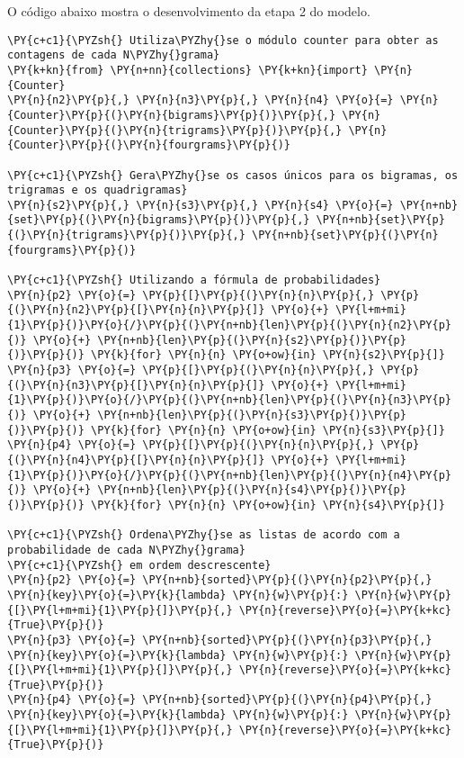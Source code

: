 \documentclass[a4paper,11pt,final]{article}
\begin{document}
O código abaixo mostra o desenvolvimento da etapa 2 do modelo.



\begin{Verbatim}[commandchars=\\\{\},frame=single,fontsize=\small, xleftmargin=0.5em]
\PY{c+c1}{\PYZsh{} Utiliza\PYZhy{}se o módulo counter para obter as contagens de cada N\PYZhy{}grama}
\PY{k+kn}{from} \PY{n+nn}{collections} \PY{k+kn}{import} \PY{n}{Counter}
\PY{n}{n2}\PY{p}{,} \PY{n}{n3}\PY{p}{,} \PY{n}{n4} \PY{o}{=} \PY{n}{Counter}\PY{p}{(}\PY{n}{bigrams}\PY{p}{)}\PY{p}{,} \PY{n}{Counter}\PY{p}{(}\PY{n}{trigrams}\PY{p}{)}\PY{p}{,} \PY{n}{Counter}\PY{p}{(}\PY{n}{fourgrams}\PY{p}{)}

\PY{c+c1}{\PYZsh{} Gera\PYZhy{}se os casos únicos para os bigramas, os trigramas e os quadrigramas}
\PY{n}{s2}\PY{p}{,} \PY{n}{s3}\PY{p}{,} \PY{n}{s4} \PY{o}{=} \PY{n+nb}{set}\PY{p}{(}\PY{n}{bigrams}\PY{p}{)}\PY{p}{,} \PY{n+nb}{set}\PY{p}{(}\PY{n}{trigrams}\PY{p}{)}\PY{p}{,} \PY{n+nb}{set}\PY{p}{(}\PY{n}{fourgrams}\PY{p}{)}

\PY{c+c1}{\PYZsh{} Utilizando a fórmula de probabilidades}
\PY{n}{p2} \PY{o}{=} \PY{p}{[}\PY{p}{(}\PY{n}{n}\PY{p}{,} \PY{p}{(}\PY{n}{n2}\PY{p}{[}\PY{n}{n}\PY{p}{]} \PY{o}{+} \PY{l+m+mi}{1}\PY{p}{)}\PY{o}{/}\PY{p}{(}\PY{n+nb}{len}\PY{p}{(}\PY{n}{n2}\PY{p}{)} \PY{o}{+} \PY{n+nb}{len}\PY{p}{(}\PY{n}{s2}\PY{p}{)}\PY{p}{)}\PY{p}{)} \PY{k}{for} \PY{n}{n} \PY{o+ow}{in} \PY{n}{s2}\PY{p}{]}
\PY{n}{p3} \PY{o}{=} \PY{p}{[}\PY{p}{(}\PY{n}{n}\PY{p}{,} \PY{p}{(}\PY{n}{n3}\PY{p}{[}\PY{n}{n}\PY{p}{]} \PY{o}{+} \PY{l+m+mi}{1}\PY{p}{)}\PY{o}{/}\PY{p}{(}\PY{n+nb}{len}\PY{p}{(}\PY{n}{n3}\PY{p}{)} \PY{o}{+} \PY{n+nb}{len}\PY{p}{(}\PY{n}{s3}\PY{p}{)}\PY{p}{)}\PY{p}{)} \PY{k}{for} \PY{n}{n} \PY{o+ow}{in} \PY{n}{s3}\PY{p}{]}
\PY{n}{p4} \PY{o}{=} \PY{p}{[}\PY{p}{(}\PY{n}{n}\PY{p}{,} \PY{p}{(}\PY{n}{n4}\PY{p}{[}\PY{n}{n}\PY{p}{]} \PY{o}{+} \PY{l+m+mi}{1}\PY{p}{)}\PY{o}{/}\PY{p}{(}\PY{n+nb}{len}\PY{p}{(}\PY{n}{n4}\PY{p}{)} \PY{o}{+} \PY{n+nb}{len}\PY{p}{(}\PY{n}{s4}\PY{p}{)}\PY{p}{)}\PY{p}{)} \PY{k}{for} \PY{n}{n} \PY{o+ow}{in} \PY{n}{s4}\PY{p}{]}

\PY{c+c1}{\PYZsh{} Ordena\PYZhy{}se as listas de acordo com a probabilidade de cada N\PYZhy{}grama}
\PY{c+c1}{\PYZsh{} em ordem descrescente}
\PY{n}{p2} \PY{o}{=} \PY{n+nb}{sorted}\PY{p}{(}\PY{n}{p2}\PY{p}{,} \PY{n}{key}\PY{o}{=}\PY{k}{lambda} \PY{n}{w}\PY{p}{:} \PY{n}{w}\PY{p}{[}\PY{l+m+mi}{1}\PY{p}{]}\PY{p}{,} \PY{n}{reverse}\PY{o}{=}\PY{k+kc}{True}\PY{p}{)}
\PY{n}{p3} \PY{o}{=} \PY{n+nb}{sorted}\PY{p}{(}\PY{n}{p3}\PY{p}{,} \PY{n}{key}\PY{o}{=}\PY{k}{lambda} \PY{n}{w}\PY{p}{:} \PY{n}{w}\PY{p}{[}\PY{l+m+mi}{1}\PY{p}{]}\PY{p}{,} \PY{n}{reverse}\PY{o}{=}\PY{k+kc}{True}\PY{p}{)}
\PY{n}{p4} \PY{o}{=} \PY{n+nb}{sorted}\PY{p}{(}\PY{n}{p4}\PY{p}{,} \PY{n}{key}\PY{o}{=}\PY{k}{lambda} \PY{n}{w}\PY{p}{:} \PY{n}{w}\PY{p}{[}\PY{l+m+mi}{1}\PY{p}{]}\PY{p}{,} \PY{n}{reverse}\PY{o}{=}\PY{k+kc}{True}\PY{p}{)}
\end{Verbatim}
\end{document}
